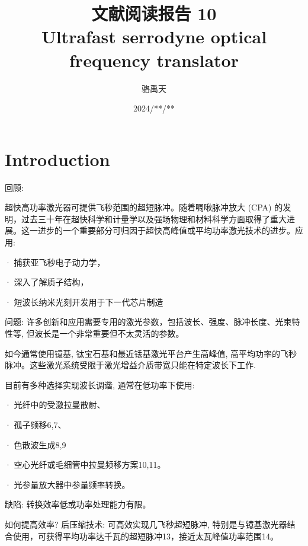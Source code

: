 \documentclass[14pt,a4paper,oneside]{article}
\title{\textbf{文献阅读报告 10\\Ultrafast serrodyne optical frequency translator}}                           %
\author{骆禹天}                                           %
\date{2024/**/**}                                        %
\numberwithin{equation}{subsection}             %
\numberwithin{figure}{subsection}               %
\begin{document}

\maketitle

\setcounter{page}{1}          %


\tableofcontents              %

\newpage
\setcounter{page}{1}          %







\section{Introduction}

回顾:

超快高功率激光器可提供飞秒范围的超短脉冲。随着啁啾脉冲放大 (CPA) 的发明，过去三十年在超快科学和计量学以及强场物理和材料科学方面取得了重大进展。这一进步的一个重要部分可归因于超快高峰值或平均功率激光技术的进步。应用:

· 捕获亚飞秒电子动力学，

· 深入了解质子结构，

· 短波长纳米光刻开发用于下一代芯片制造

问题: 许多创新和应用需要专用的激光参数，包括波长、强度、脉冲长度、光束特性等, 但波长是一个非常重要但不太灵活的参数。



如今通常使用镱基, 钛宝石基和最近铥基激光平台产生高峰值, 高平均功率的飞秒脉冲。这些激光系统受限于激光增益介质带宽只能在特定波长下工作. 

目前有多种选择实现波长调谐, 通常在低功率下使用:

· 光纤中的受激拉曼散射、

· 孤子频移6,7、

· 色散波生成8,9

· 空心光纤或毛细管中拉曼频移方案10,11。

· 光参量放大器中参量频率转换。

缺陷: 转换效率低或功率处理能力有限。

如何提高效率? 后压缩技术: 可高效实现几飞秒超短脉冲, 特别是与镱基激光器结合使用，可获得平均功率达千瓦的超短脉冲13，接近太瓦峰值功率范围14。
\end{document}
